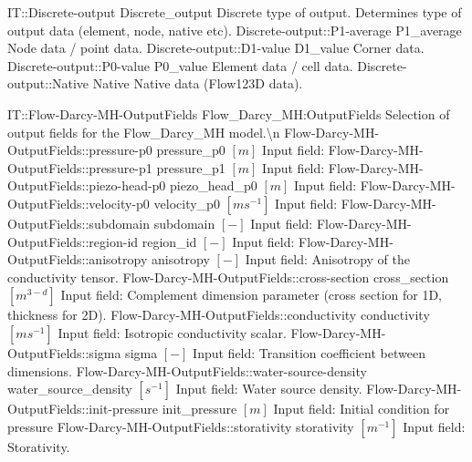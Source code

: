 \begin{SelectionType}
	{IT::Discrete-output}
	{Discrete{\_}output}
	{{{Discrete type of output.
Determines type of output data (element, node, native etc).}%
}}
		\SelectionItem
			{Discrete-output::P1-average}
			{P1{\_}average}
			{{{Node data / point data.}%
}}
		\SelectionItem
			{Discrete-output::D1-value}
			{D1{\_}value}
			{{{Corner data.}%
}}
		\SelectionItem
			{Discrete-output::P0-value}
			{P0{\_}value}
			{{{Element data / cell data.}%
}}
		\SelectionItem
			{Discrete-output::Native}
			{Native}
			{{{Native data (Flow123D data).}%
}}
\end{SelectionType}
\begin{SelectionType}
	{IT::Flow-Darcy-MH-OutputFields}
	{Flow{\_}Darcy{\_}MH:OutputFields}
	{{{Selection of output fields for the Flow{\_}Darcy{\_}MH model.{\textbackslash}n}%
}}
		\SelectionItem
			{Flow-Darcy-MH-OutputFields::pressure-p0}
			{pressure{\_}p0}
			{{{}{$[m]$}{ Input field: }%
}}
		\SelectionItem
			{Flow-Darcy-MH-OutputFields::pressure-p1}
			{pressure{\_}p1}
			{{{}{$[m]$}{ Input field: }%
}}
		\SelectionItem
			{Flow-Darcy-MH-OutputFields::piezo-head-p0}
			{piezo{\_}head{\_}p0}
			{{{}{$[m]$}{ Input field: }%
}}
		\SelectionItem
			{Flow-Darcy-MH-OutputFields::velocity-p0}
			{velocity{\_}p0}
			{{{}{$[ms^{-1}]$}{ Input field: }%
}}
		\SelectionItem
			{Flow-Darcy-MH-OutputFields::subdomain}
			{subdomain}
			{{{}{$[-]$}{ Input field: }%
}}
		\SelectionItem
			{Flow-Darcy-MH-OutputFields::region-id}
			{region{\_}id}
			{{{}{$[-]$}{ Input field: }%
}}
		\SelectionItem
			{Flow-Darcy-MH-OutputFields::anisotropy}
			{anisotropy}
			{{{}{$[-]$}{ Input field: Anisotropy of the conductivity tensor.}%
}}
		\SelectionItem
			{Flow-Darcy-MH-OutputFields::cross-section}
			{cross{\_}section}
			{{{}{$[m^{3-d}]$}{ Input field: Complement dimension parameter (cross section for 1D, thickness for 2D).}%
}}
		\SelectionItem
			{Flow-Darcy-MH-OutputFields::conductivity}
			{conductivity}
			{{{}{$[ms^{-1}]$}{ Input field: Isotropic conductivity scalar.}%
}}
		\SelectionItem
			{Flow-Darcy-MH-OutputFields::sigma}
			{sigma}
			{{{}{$[-]$}{ Input field: Transition coefficient between dimensions.}%
}}
		\SelectionItem
			{Flow-Darcy-MH-OutputFields::water-source-density}
			{water{\_}source{\_}density}
			{{{}{$[s^{-1}]$}{ Input field: Water source density.}%
}}
		\SelectionItem
			{Flow-Darcy-MH-OutputFields::init-pressure}
			{init{\_}pressure}
			{{{}{$[m]$}{ Input field: Initial condition for pressure}%
}}
		\SelectionItem
			{Flow-Darcy-MH-OutputFields::storativity}
			{storativity}
			{{{}{$[m^{-1}]$}{ Input field: Storativity.}%
}}
\end{SelectionType}

